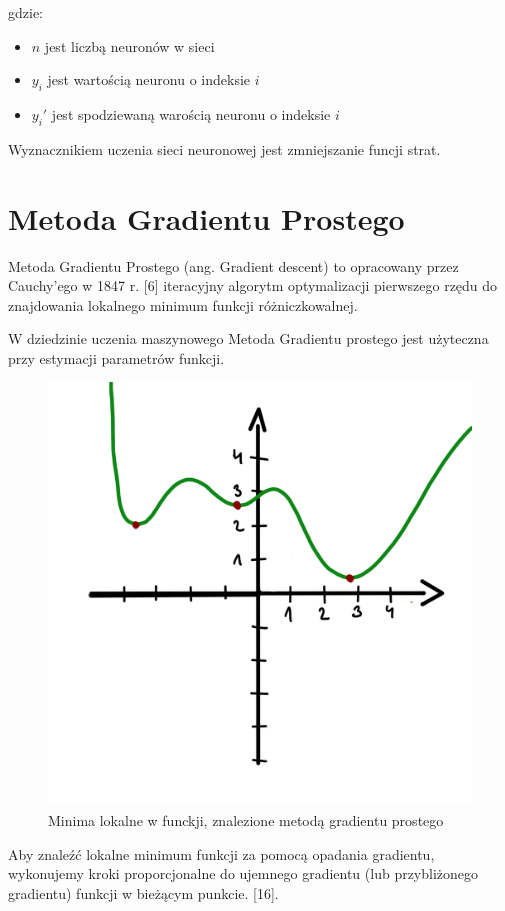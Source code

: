 \documentclass[brudnopis]{xmgr}
\begin{document}
gdzie: 

\begin{itemize}
\item $n$ jest liczbą neuronów w sieci
\item $y_i$ jest wartością neuronu o indeksie $i$ 
\item $y_i'$ jest spodziewaną warością neuronu o indeksie $i$ 
\end{itemize}

Wyznacznikiem uczenia sieci neuronowej jest zmniejszanie funcji strat. 


 \section{Metoda Gradientu Prostego\label{s:dsssl}}

Metoda Gradientu Prostego (ang. Gradient descent) to opracowany przez Cauchy'ego w 1847 r. [6] iteracyjny algorytm optymalizacji pierwszego rzędu do znajdowania lokalnego minimum funkcji różniczkowalnej.

W dziedzinie uczenia maszynowego Metoda Gradientu prostego jest użyteczna przy estymacji parametrów funkcji. 


\begin{figure}[!tbh]
\centering
\includegraphics[width=.8\hsize]{fig/11}
\caption{Minima lokalne w funckji, znalezione metodą gradientu prostego\label{RYS.3}}
\end{figure}

Aby znaleźć lokalne minimum funkcji za pomocą opadania gradientu, wykonujemy kroki proporcjonalne do ujemnego gradientu (lub przybliżonego gradientu) funkcji w bieżącym punkcie.  [16]. 
\end{document}
